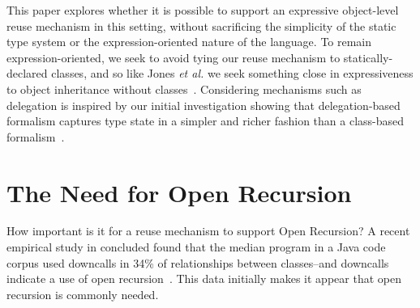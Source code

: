 \documentclass[preprint,10pt]{sigplanconf}
\begin{document}
This paper explores whether it is possible to support an expressive
object-level reuse mechanism in this setting, without sacrificing
the simplicity of the static type system or the expression-oriented
nature of the language.  To remain expression-oriented, we seek to
avoid tying our reuse mechanism to statically-declared classes,
and so like Jones \textit{et al.} we seek something close in
expressiveness to object inheritance without
classes~\cite{jones:2016:inheritance}.
Considering mechanisms such
as delegation is inspired by our initial 
investigation showing that delegation-based formalism captures type state in a simpler and richer fashion than a class-based formalism~\cite{li:2015:ftfjp-typestate}.


\section{The Need for Open Recursion}


How important is it for a reuse mechanism to support Open Recursion?
A recent empirical study in concluded found that the median program
in a Java code corpus used downcalls in 34\% of relationships
between classes--and downcalls indicate a use of open
recursion~\cite{tempero2013programmers}.
This data initially makes it appear that open recursion is commonly
needed.

\end{document}
